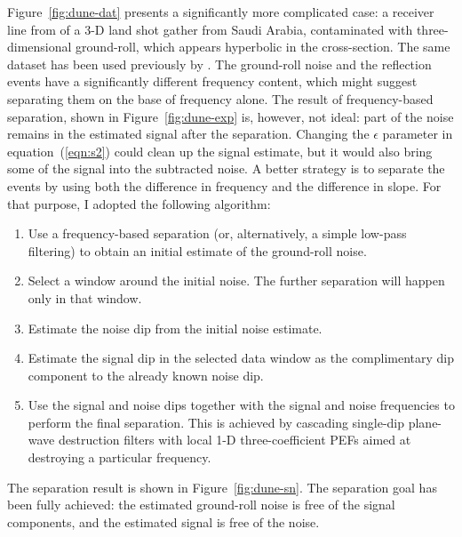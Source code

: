 
Figure~\ref{fig:dune-dat} presents a significantly more complicated
case: a receiver line from of a 3-D land shot gather from Saudi
Arabia, contaminated with three-dimensional ground-roll, which appears 
hyperbolic in the cross-section.
The same dataset has been used previously by \cite{morganSEG}.
The ground-roll noise and the reflection events have a significantly
different frequency content, which might suggest separating
them on the base of frequency alone. The result of frequency-based
separation, shown in Figure~\ref{fig:dune-exp} is, however, not ideal:
part of the noise remains in the estimated signal after the
separation. Changing the $\epsilon$ parameter in
equation~(\ref{eqn:s2}) could clean up the signal estimate, but it
would also bring some of the signal into the subtracted noise. A
better strategy is to separate the events by using both the difference
in frequency and the difference in slope. For that purpose, I adopted
the following algorithm:
\begin{enumerate}
\item Use a frequency-based separation (or, alternatively, a simple
  low-pass filtering) to obtain an initial estimate of the ground-roll
  noise.
\item Select a window around the initial noise. The further
  separation will happen only in that window.
\item Estimate the noise dip from the initial noise estimate.
\item Estimate the signal dip in the selected data window as the
  complimentary dip component to the already known noise dip.
\item Use the signal and noise dips together with the signal and noise
  frequencies to perform the final separation. This is
  achieved by cascading single-dip plane-wave destruction filters with
  local 1-D three-coefficient PEFs aimed at destroying a particular
  frequency.
\end{enumerate}
The separation result is shown in Figure~\ref{fig:dune-sn}. The
separation goal has been fully achieved: the estimated ground-roll noise is
free of the signal components, and the estimated signal is free of the
noise.




